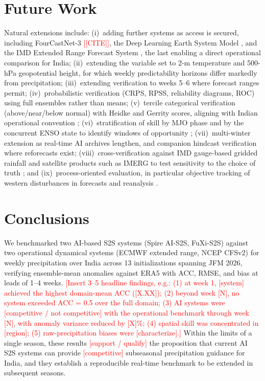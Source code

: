 \documentclass[11pt]{article}
\newcommand{\ph}[1]{\textcolor{red}{[#1]}}
\begin{document}
\section{Future Work}\label{sec:future}

Natural extensions include: (i)~adding further systems as access is
secured, including FourCastNet-3 \ph{[CITE]}, the Deep Learning Earth
System Model \citep{cresswellclay2024}, and the IMD Extended Range
Forecast System \citep{pattanaik2019}, the last enabling a direct
operational comparison for India; (ii)~extending the variable set to
2-m temperature and 500-hPa geopotential height, for which weekly
predictability horizons differ markedly from precipitation;
(iii)~extending verification to weeks 5--6 where forecast ranges
permit; (iv)~probabilistic verification (CRPS, RPSS, reliability
diagrams, ROC) using full ensembles rather than means; (v)~tercile
categorical verification (above/near/below normal) with Heidke and
Gerrity scores, aligning with Indian operational convention
\citep{pattanaik2019,wilks2019}; (vi)~stratification of skill by MJO
phase \citep{wheelerhendon2004} and by the concurrent ENSO state to
identify windows of opportunity \citep{mariotti2020};
(vii)~multi-winter extension as real-time AI archives lengthen, and
companion hindcast verification where reforecasts exist;
(viii)~cross-verification against IMD gauge-based gridded rainfall
and satellite products such as IMERG to test sensitivity to the
choice of truth \citep{pai2014}; and (ix)~process-oriented
evaluation, in particular objective tracking of western disturbances
in forecasts and reanalysis \citep{hunt2018,dimri2015}.

\section{Conclusions}\label{sec:conclusions}

We benchmarked two AI-based S2S systems (Spire AI-S2S, FuXi-S2S)
against two operational dynamical systems (ECMWF extended range, NCEP
CFSv2) for weekly precipitation over India across 13 initializations
spanning JFM 2026, verifying ensemble-mean anomalies against ERA5
with ACC, RMSE, and bias at leads of 1--4 weeks. \ph{Insert 3--5
headline findings, e.g.: (1) at week 1, [system] achieved the highest
domain-mean ACC ([X.XX]); (2) beyond week [N], no system exceeded
ACC = 0.5 over the full domain; (3) AI systems were [competitive /
not competitive] with the operational benchmark through week [N],
with anomaly variance reduced by [X]\%; (4) spatial skill was
concentrated in [region]; (5) raw-precipitation biases were
[characterize].} Within the limits of a single season, these results
\ph{support / qualify} the proposition that current AI S2S systems
can provide \ph{competitive} subseasonal precipitation guidance for
India, and they establish a reproducible real-time benchmark to be
extended in subsequent seasons.
\end{document}
